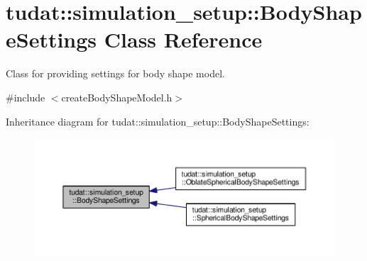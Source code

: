 \hypertarget{classtudat_1_1simulation__setup_1_1BodyShapeSettings}{}\section{tudat\+:\+:simulation\+\_\+setup\+:\+:Body\+Shape\+Settings Class Reference}
\label{classtudat_1_1simulation__setup_1_1BodyShapeSettings}


Class for providing settings for body shape model.  




{\ttfamily \#include $<$create\+Body\+Shape\+Model.\+h$>$}



Inheritance diagram for tudat\+:\+:simulation\+\_\+setup\+:\+:Body\+Shape\+Settings\+:
\nopagebreak
\begin{figure}[H]
\begin{center}
\leavevmode
\includegraphics[width=350pt]{classtudat_1_1simulation__setup_1_1BodyShapeSettings__inherit__graph}
\end{center}
\end{figure}
